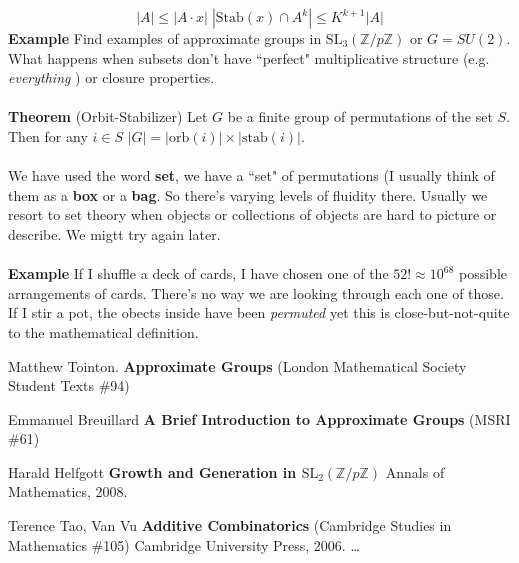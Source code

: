 \documentclass[12pt]{article}
\begin{document}
{$$ |A| \leq |A \cdot x| \; | \text{Stab}(x) \cap A^k| \leq K^{k+1}|A| $$
\textbf{Example} Find examples of approximate groups in $\text{SL}_3(\mathbb{Z}/p\mathbb{Z})$ or $G = SU(2)$.  What happens when subsets don't have ``perfect" multiplicative structure (e.g. \textit{everything} ) or closure properties. \\ \\
\textbf{Theorem} (Orbit-Stabilizer) Let $G$ be a finite group of permutations of the set $S$.  Then for any $i \in S$ $|G| = | \text{orb}(i)| \times |\text{stab}(i)|$.  \\ \\
We have used the word {\color{red!80!black}\textbf{set}}, we  have a ``set" of permutations (I usually think of them as a \textbf{box} or a \textbf{bag}.  So there's varying levels of fluidity there.  Usually we resort to set theory when objects or collections of objects are hard to picture or describe.  We migtt try again later. \\ \\
\textbf{Example} If I shuffle a deck of cards, I have chosen one of the $52! \approx 10^{68}$ possible arrangements of cards.  There's no way we are looking through each one of those.  If I stir a pot, the obects inside have been \textit{permuted}  yet this is close-but-not-quite to the mathematical definition.

\vfill

\begin{thebibliography}{}

\item Matthew Tointon.  \textbf{Approximate Groups} (London Mathematical Society Student Texts \#94)

\item Emmanuel Breuillard \textbf{A Brief Introduction to Approximate Groups} (MSRI \#61)

\item Harald Helfgott \textbf{Growth and Generation in $\text{SL}_2 (\mathbb{Z}/p\mathbb{Z})$} Annals of Mathematics, 2008.

\item Terence Tao, Van Vu \textbf{Additive Combinatorics}  (Cambridge Studies in Mathematics \#105) Cambridge University Press, 2006. \dots

\end{thebibliography}
}
\end{document}
